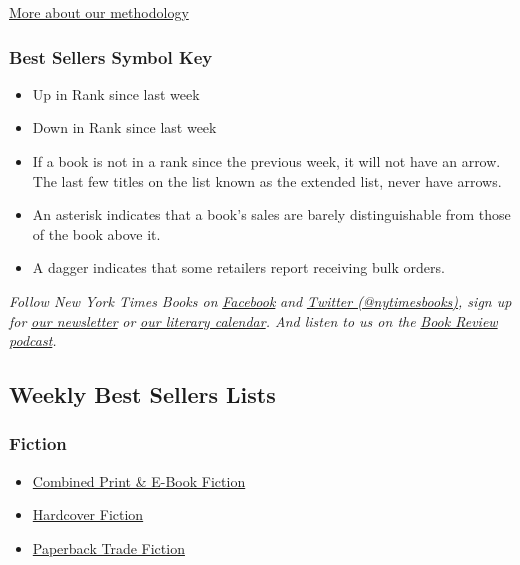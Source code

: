 \href{/books/best-sellers/methodology/}{More about our methodology}

\hypertarget{best-sellers-symbol-key}{%
\subsubsection{Best Sellers Symbol Key}\label{best-sellers-symbol-key}}

\begin{itemize}
\item
  Up in Rank since last week
\item
  Down in Rank since last week
\item
  If a book is not in a rank since the previous week, it will not have
  an arrow. The last few titles on the list known as the extended list,
  never have arrows.
\item
  An asterisk indicates that a book's sales are barely distinguishable
  from those of the book above it.
\item
  A dagger indicates that some retailers report receiving bulk orders.
\end{itemize}

\emph{Follow New York Times Books on}
\href{https://www.facebookcorewwwi.onion/nytbooks/}{\emph{Facebook}}
\emph{and} \href{https://twitter.com/nytimesbooks}{\emph{Twitter
(@nytimesbooks)}}\emph{, sign up for}
\href{https://www.nytimes3xbfgragh.onion/newsletters/books-review}{\emph{our
newsletter}} \emph{or}
\href{https://www.nytimes3xbfgragh.onion/interactive/2017/books/books-calendar.html}{\emph{our
literary calendar}}\emph{. And listen to us on the}
\href{https://www.nytimes3xbfgragh.onion/column/book-review-podcast}{\emph{Book
Review podcast}}\emph{.}

\hypertarget{weekly-best-sellers-lists}{%
\subsection{Weekly Best Sellers Lists}\label{weekly-best-sellers-lists}}

\hypertarget{fiction}{%
\subsubsection{Fiction}\label{fiction}}

\begin{itemize}
\tightlist
\item
  \href{/books/best-sellers/combined-print-and-e-book-fiction/}{Combined
  Print \& E-Book Fiction}
\item
  \href{/books/best-sellers/hardcover-fiction/}{Hardcover Fiction}
\item
  \href{/books/best-sellers/trade-fiction-paperback/}{Paperback Trade
  Fiction}
\end{itemize}

